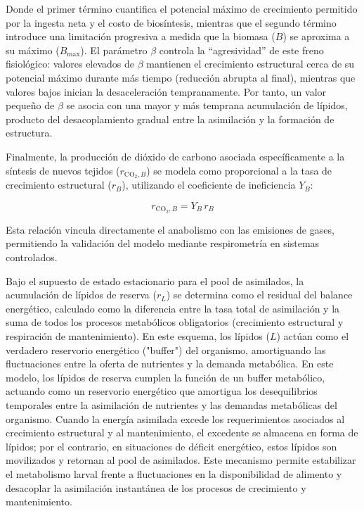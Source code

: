 Donde el primer término cuantifica el potencial máximo de crecimiento permitido por la ingesta neta y 
el costo de biosíntesis, mientras que el segundo término introduce una limitación progresiva a medida 
que la biomasa ($B$) se aproxima a su máximo ($B_{\max}$). El parámetro $\beta$ controla la ``agresividad''
de este freno fisiológico: valores elevados de $\beta$ mantienen el crecimiento estructural cerca de su 
potencial máximo durante más tiempo (reducción abrupta al final), mientras que valores bajos inician 
la desaceleración tempranamente. Por tanto, un valor pequeño de $\beta$ se asocia con una mayor y más 
temprana acumulación de lípidos, producto del desacoplamiento gradual entre la asimilación y la 
formación de estructura.

Finalmente, la producción de dióxido de carbono asociada específicamente a la síntesis de nuevos 
tejidos ($r_{\mathrm{CO_2},B}$) se modela como proporcional a la tasa de crecimiento estructural ($r_B$), 
utilizando el coeficiente de ineficiencia $Y_B$:

\begin{equation}
r_{\mathrm{CO_2},B} = Y_B \, r_B
\label{eq:CO2B}
\end{equation}

Esta relación vincula directamente el anabolismo con las emisiones de gases, permitiendo la validación 
del modelo mediante respirometría en sistemas controlados.

Bajo el supuesto de estado estacionario para el pool de asimilados, la acumulación de 
lípidos de reserva ($r_L$) se determina como el residual del balance energético, calculado 
como la diferencia entre la tasa total de asimilación y la suma de todos los procesos 
metabólicos obligatorios (crecimiento estructural y respiración de mantenimiento). 
En este esquema, los lípidos ($L$) actúan como el verdadero reservorio energético ("buffer") 
del organismo, amortiguando las fluctuaciones entre la oferta de nutrientes y la demanda metabólica.
En este modelo, los lípidos de reserva cumplen la función de un buffer metabólico, actuando como un reservorio energético que amortigua los desequilibrios temporales entre la asimilación de nutrientes y las demandas metabólicas del organismo. Cuando la energía asimilada excede los requerimientos asociados al crecimiento estructural y al mantenimiento, el excedente se almacena en forma de lípidos; por el contrario, en situaciones de déficit energético, estos lípidos son movilizados y retornan al pool de asimilados. Este mecanismo permite estabilizar el metabolismo larval frente a fluctuaciones en la disponibilidad de alimento y desacoplar la asimilación instantánea de los procesos de crecimiento y mantenimiento.

